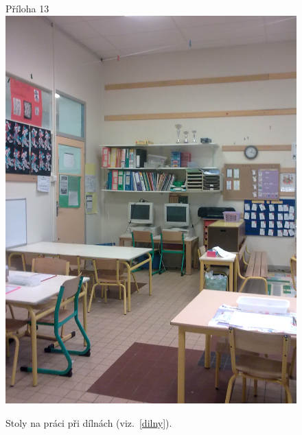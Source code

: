 	\begin{figure}[tb]
		\centering
		Příloha 13\\
		\includegraphics[height=0.35\textheight]{./fotky/Obr13.jpg}
		\caption{
			Stoly na práci při dílnách (viz.~\ref{dilny}).
		}
		\label{Obr13}
	\end{figure}
